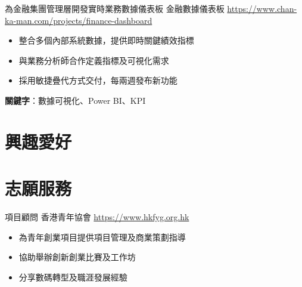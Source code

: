 \documentclass[a4paper, serif, 10pt]{moderncv}
\begin{document}
        {為金融集團管理層開發實時業務數據儀表板}
        {金融數據儀表板}
        {\url{https://www.chan-ka-man.com/projects/finance-dashboard}}
        {}
        {\begin{itemize}
\item 整合多個內部系統數據，提供即時關鍵績效指標
\item 與業務分析師合作定義指標及可視化需求
\item 採用敏捷疊代方式交付，每兩週發布新功能
\end{itemize}
\textbf{關鍵字}：數據可視化、Power BI、KPI}
\section{興趣愛好}

\section{志願服務}

        {項目顧問}
        {香港青年協會}
        {\url{https://www.hkfyg.org.hk}}
        {}
        {\begin{itemize}
\item 為青年創業項目提供項目管理及商業策劃指導
\item 協助舉辦創新創業比賽及工作坊
\item 分享數碼轉型及職涯發展經驗
\end{itemize}}
    
\end{document}
